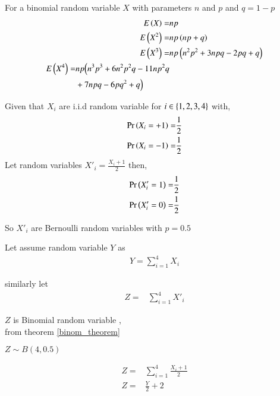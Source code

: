 \documentclass[journal,12pt,twocolumn]{IEEEtran}
\begin{document}
\begin{corollary}
For a binomial random variable $X$ with parameters $n$ and $p$ and $q=1-p$
\begin{align}
    E\left(X\right)=& n p 
    \\E\left(X^2\right)=& n p \left(n p+q\right)
    \\E\left(X^3\right)=& n p \left(n^{2} p^{2} + 3 n p q - 2 p q + q\right)
    \\
    \begin{split}
         E\left(X^4\right)=&n p \Bigl(n^{3} p^{3} + 6 n^{2} p^{2} q
        - 11 n p^{2} q  \\& + 7 n p q - 6 p q^{2} + q\Bigr)
    \end{split}
\end{align}
\label{corolary-momentof-Binom}
\end{corollary}
Given that $X_i$ are i.i.d random variable for $i \in \left\{1,2,3,4\right\} $ 
with,
\begin{align}
    \Pr\left(X_i=+1\right)=&\frac{1}{2}
    \\\Pr\left(X_i=-1\right)=&\frac{1}{2}
\end{align}
Let random variables $X'_i=\frac{X_i+1}{2}$ then,
\begin{align}
    \Pr\left(X'_i=1\right)=&\frac{1}{2}
    \\\Pr\left(X'_i=0\right)=&\frac{1}{2}
\end{align}

So $X'_i$ are Bernoulli random variables with $p=0.5$

Let assume random variable $Y$ as
\begin{align}
Y=\sum_{i=1}^{4}X_i
\end{align} 

similarly let 
\begin{align}
Z=&\sum_{i=1}^{4}X'_i
\end{align}


\begin{corollary}
$Z$  is Binomial random variable , \\from theorem \ref{binom_theorem}

{\centering
${\displaystyle Z \sim  {B} (4,0.5)}$

}
\label{cor-Z_as_binom}
\end{corollary}

\begin{align}
Z=&\sum_{i=1}^{4} \frac{X_i+1}{2}
\\ Z=&\frac{Y}{2} + 2
\end{align}
\end{document}
